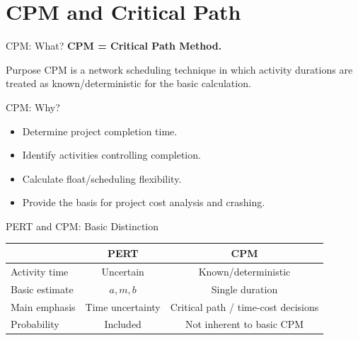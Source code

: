 \documentclass[aspectratio=169,10pt]{beamer}
\begin{document}
\section{CPM and Critical Path}

\begin{frame}{CPM: What?}
\textbf{CPM = Critical Path Method.}
\begin{block}{Purpose}
CPM is a network scheduling technique in which activity durations are treated as known/deterministic for the basic calculation.
\end{block}
\end{frame}

\begin{frame}{CPM: Why?}
\begin{itemize}
  \item Determine project completion time.
  \item Identify activities controlling completion.
  \item Calculate float/scheduling flexibility.
  \item Provide the basis for project cost analysis and crashing.
\end{itemize}
\end{frame}

\begin{frame}{PERT and CPM: Basic Distinction}
\centering
\small
\begin{tabular}{l|c|c}
\toprule
 & PERT & CPM\\
\midrule
Activity time & Uncertain & Known/deterministic\\
Basic estimate & $a,m,b$ & Single duration\\
Main emphasis & Time uncertainty & Critical path / time-cost decisions\\
Probability & Included & Not inherent to basic CPM\\
\bottomrule
\end{tabular}
\end{frame}
\end{document}
